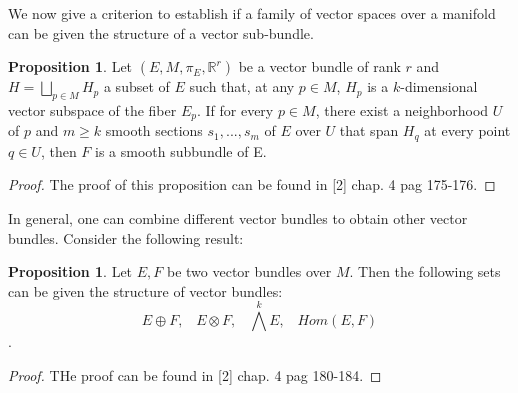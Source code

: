 \documentclass[12pt,a4paper]{report}
\theoremstyle{definition}
\theoremstyle{Theorem}
\newtheorem{Prop}[Def]{Proposition}
\theoremstyle{definition}
\theoremstyle{definition}
\begin{document}
	We now give a criterion to establish if a family of vector spaces over a manifold can be given the structure of a vector sub-bundle.
	\begin{Prop}
		Let $(E,M,\pi_E,\mathbb{R}^r)$ be a vector bundle of rank $r$ and $H=\bigsqcup_{p\in M}H_p$ a subset of $E$ such that, at any $p\in M$, $H_p$ is a $k$-dimensional vector subspace of the fiber $E_p$. If for every $p\in M$, there exist a neighborhood $U$ of $p$ and $m \geq k$ smooth sections $s_1,...,s_m$ of $E$ over $U$ that span $H_q$ at every point $q \in U$, then $F$ is a smooth subbundle of E.
	\end{Prop}
	\begin{proof}
		The proof of this proposition can be found in [2] chap. 4 pag 175-176.
	\end{proof}
	In general, one can combine different vector bundles to obtain other vector bundles. Consider the following result:
	\begin{Prop}
		Let $E,F$ be two vector bundles over $M$. Then the following sets can be given the structure of vector bundles:
		$$E\oplus F,\hspace{10pt}E\otimes F,\hspace{10pt}\bigwedge^k E,\hspace{10pt}Hom(E, F)$$.
	\end{Prop}
	\begin{proof}
		THe proof can be found in [2] chap. 4 pag 180-184.
	\end{proof}
\end{document}
